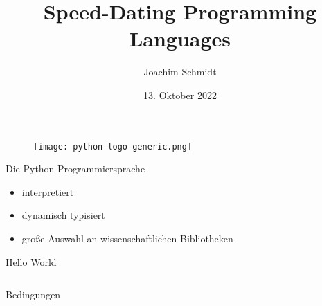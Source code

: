 \documentclass[aspectratio=169]{beamer}
\title{Speed-Dating Programming Languages}
\author{Joachim Schmidt}
\date{13. Oktober 2022}
\begin{document}
%
%
%
%



\begin{frame}{}
  \begin{figure}
    \centering
    \texttt{[image: python-logo-generic.png]}
    \caption{\cite{python_logo}}
    \label{fig:python_logo}
  \end{figure}
\end{frame}

\begin{frame}{Die Python Programmiersprache}
  \begin{itemize}
  \item interpretiert
  \item dynamisch typisiert
  \item große Auswahl an wissenschaftlichen Bibliotheken
  \end{itemize}
\end{frame}

\begin{frame}{Hello World}
  \inputminted[linenos]{python}{examples/hello.py}
\end{frame}

\begin{frame}{Bedingungen}
  \inputminted[linenos]{python}{examples/condition.py}
\end{frame}
\end{document}
